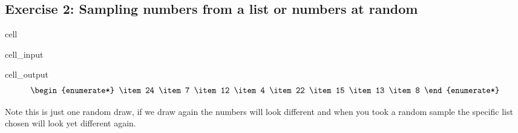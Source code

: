 \documentclass[letterpaper,10pt,english]{jupyterBook}
\begin{document}
\subsection{Exercise 2: Sampling numbers from a list or numbers at random}
\label{\detokenize{exercises_unit_3:exercise-2-sampling-numbers-from-a-list-or-numbers-at-random}}
\begin{sphinxuseclass}{cell}\begin{sphinxVerbatimInput}

\begin{sphinxuseclass}{cell_input}
\begin{sphinxVerbatim}[commandchars=\\\{\}]
\end{sphinxVerbatim}

\end{sphinxuseclass}\end{sphinxVerbatimInput}
\begin{sphinxVerbatimOutput}

\begin{sphinxuseclass}{cell_output}\begin{equation*}
\begin{split}\begin{enumerate*}
\item 24
\item 7
\item 12
\item 4
\item 22
\item 15
\item 13
\item 8
\end{enumerate*}\end{split}
\end{equation*}
\end{sphinxuseclass}\end{sphinxVerbatimOutput}

\end{sphinxuseclass}
\sphinxAtStartPar
Note this is just one random draw, if we draw again the numbers will look different and when you took a random sample the specific list chosen will look yet different again.
\end{document}

